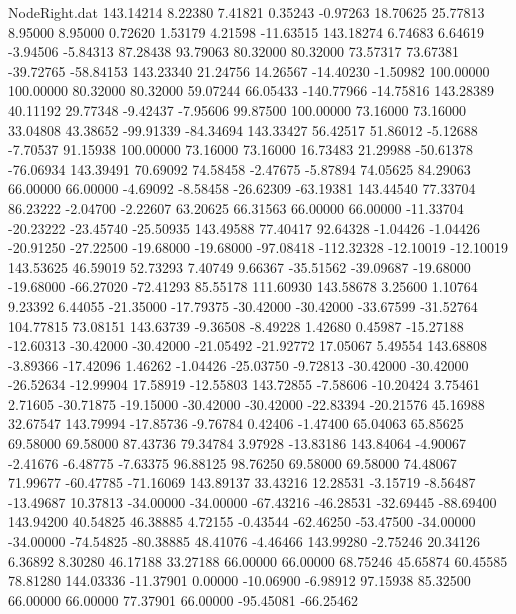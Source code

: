 \begin{filecontents}{NodeRight.dat}
 143.14214    8.22380    7.41821     0.35243   -0.97263   18.70625   25.77813    8.95000    8.95000    0.72620    1.53179    4.21598  -11.63515
 143.18274    6.74683    6.64619    -3.94506   -5.84313   87.28438   93.79063   80.32000   80.32000   73.57317   73.67381  -39.72765  -58.84153
 143.23340   21.24756   14.26567   -14.40230   -1.50982  100.00000  100.00000   80.32000   80.32000   59.07244   66.05433 -140.77966  -14.75816
 143.28389   40.11192   29.77348    -9.42437   -7.95606   99.87500  100.00000   73.16000   73.16000   33.04808   43.38652  -99.91339  -84.34694
 143.33427   56.42517   51.86012    -5.12688   -7.70537   91.15938  100.00000   73.16000   73.16000   16.73483   21.29988  -50.61378  -76.06934
 143.39491   70.69092   74.58458    -2.47675   -5.87894   74.05625   84.29063   66.00000   66.00000   -4.69092   -8.58458  -26.62309  -63.19381
 143.44540   77.33704   86.23222    -2.04700   -2.22607   63.20625   66.31563   66.00000   66.00000  -11.33704  -20.23222  -23.45740  -25.50935
 143.49588   77.40417   92.64328    -1.04426   -1.04426  -20.91250  -27.22500  -19.68000  -19.68000  -97.08418 -112.32328  -12.10019  -12.10019
 143.53625   46.59019   52.73293     7.40749    9.66367  -35.51562  -39.09687  -19.68000  -19.68000  -66.27020  -72.41293   85.55178  111.60930
 143.58678    3.25600    1.10764     9.23392    6.44055  -21.35000  -17.79375  -30.42000  -30.42000  -33.67599  -31.52764  104.77815   73.08151
 143.63739   -9.36508   -8.49228     1.42680    0.45987  -15.27188  -12.60313  -30.42000  -30.42000  -21.05492  -21.92772   17.05067    5.49554
 143.68808   -3.89366  -17.42096     1.46262   -1.04426  -25.03750   -9.72813  -30.42000  -30.42000  -26.52634  -12.99904   17.58919  -12.55803
 143.72855   -7.58606  -10.20424     3.75461    2.71605  -30.71875  -19.15000  -30.42000  -30.42000  -22.83394  -20.21576   45.16988   32.67547
 143.79994  -17.85736   -9.76784     0.42406   -1.47400   65.04063   65.85625   69.58000   69.58000   87.43736   79.34784    3.97928  -13.83186
 143.84064   -4.90067   -2.41676    -6.48775   -7.63375   96.88125   98.76250   69.58000   69.58000   74.48067   71.99677  -60.47785  -71.16069
 143.89137   33.43216   12.28531    -3.15719   -8.56487  -13.49687   10.37813  -34.00000  -34.00000  -67.43216  -46.28531  -32.69445  -88.69400
 143.94200   40.54825   46.38885     4.72155   -0.43544  -62.46250  -53.47500  -34.00000  -34.00000  -74.54825  -80.38885   48.41076   -4.46466
 143.99280   -2.75246   20.34126     6.36892    8.30280   46.17188   33.27188   66.00000   66.00000   68.75246   45.65874   60.45585   78.81280
 144.03336  -11.37901    0.00000   -10.06900   -6.98912   97.15938   85.32500   66.00000   66.00000   77.37901   66.00000  -95.45081  -66.25462

\end{filecontents}
